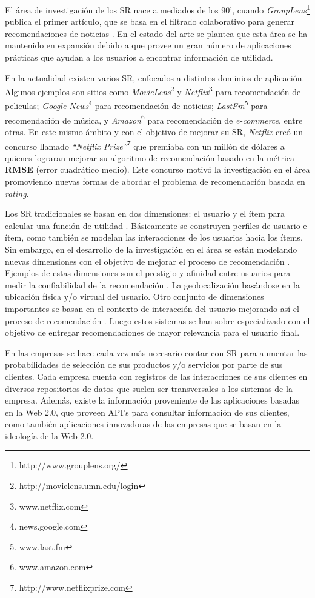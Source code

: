 El área de investigación de los SR nace a mediados de los 90’, cuando \textit{GroupLens}\footnote{http://www.grouplens.org/} publica el primer artículo, que se basa en el filtrado colaborativo para generar recomendaciones de noticias \citep{Herlocker:1999}. En el estado del arte \citep{Adomavicius:2005} se plantea que esta área se ha mantenido en expansión debido a que provee un gran número de aplicaciones prácticas que ayudan a los usuarios a encontrar información de utilidad.

En la actualidad existen varios SR, enfocados a distintos dominios de aplicación. Algunos ejemplos son sitios como \textit{MovieLens}\footnote{http://movielens.umn.edu/login} y \textit{Netflix}\footnote{www.netflix.com} para recomendación de peliculas; \textit{Google News}\footnote{news.google.com} para recomendación de noticias; \textit{LastFm}\footnote{www.last.fm} para recomendación de música, y \textit{Amazon}\footnote{www.amazon.com} para recomendación de \textit{e-commerce}, entre otras. En este mismo ámbito y con el objetivo de mejorar su SR, \textit{Netflix} creó un concurso llamado \textit{“Netflix Prize”}\footnote{http://www.netflixprize.com} que premiaba con un millón de dólares a quienes lograran mejorar su algoritmo de recomendación basado en la métrica \textbf{RMSE} (error cuadrático medio). Este concurso motivó la investigación en el área promoviendo nuevas formas de abordar el problema de recomendación basada en \textit{rating}. 

Los SR tradicionales se basan en dos dimensiones: el usuario y el ítem para calcular una función de utilidad \citep{Adomavicius:2005}. Básicamente se construyen perfiles de usuario e ítem, como también se modelan las interacciones de los usuarios hacia los ítems. Sin embargo, en el desarrollo de la investigación en el área se están modelando nuevas dimensiones con el objetivo de mejorar el proceso de recomendación \citep{Adomavicius:2011}. Ejemplos de estas dimensiones son el prestigio y afinidad entre usuarios para medir la confiabilidad de la recomendación \citep{Victor:2011}. La geolocalización \citep{Panagiotis:2011} basándose en la ubicación física y/o virtual del usuario. Otro conjunto de dimensiones importantes se basan en el contexto de interacción del usuario mejorando así el proceso de recomendación \citep{Adomavicius:2011}. Luego  estos sistemas se han sobre-especializado con el objetivo de entregar recomendaciones de mayor relevancia para el usuario final.

En las empresas se hace cada vez más necesario contar con SR para aumentar las probabilidades de selección de sus productos y/o servicios por parte de sus clientes. Cada empresa cuenta con registros de las interacciones de sus clientes en diversos repositorios de datos que suelen ser transversales a los sistemas de la empresa. Además, existe la información proveniente de las aplicaciones basadas en la Web 2.0, que proveen API’s para consultar información de sus clientes, como también aplicaciones innovadoras de las empresas que se basan en la ideología de la Web 2.0.

